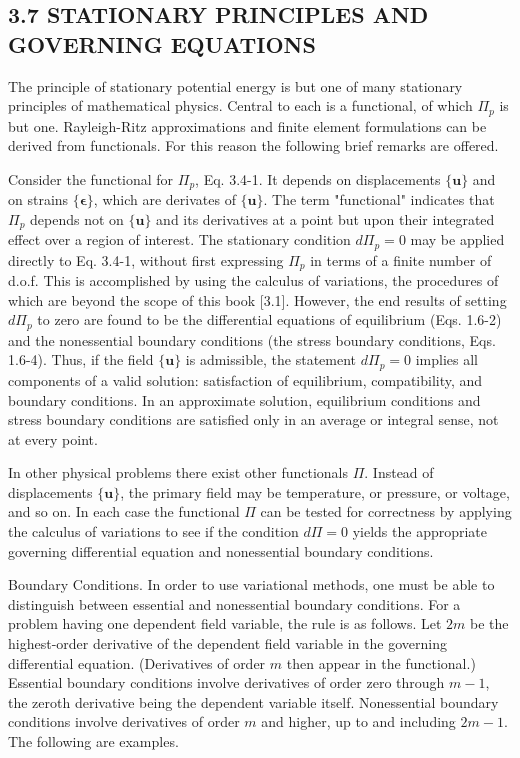 \documentclass[10pt]{article}
\begin{document}
\subsection*{3.7 STATIONARY PRINCIPLES AND GOVERNING EQUATIONS}

The principle of stationary potential energy is but one of many stationary principles of mathematical physics. Central to each is a functional, of which $\Pi_{p}$ is but one. Rayleigh-Ritz approximations and finite element formulations can be derived from functionals. For this reason the following brief remarks are offered.

Consider the functional for $\Pi_{p}$, Eq. 3.4-1. It depends on displacements $\{\mathbf{u}\}$ and on strains $\{\boldsymbol{\epsilon}\}$, which are derivates of $\{\mathbf{u}\}$. The term "functional" indicates that $\Pi_{p}$ depends not on $\{\mathbf{u}\}$ and its derivatives at a point but upon their integrated effect over a region of interest. The stationary condition $d \Pi_{p}=0$ may be applied directly to Eq. 3.4-1, without first expressing $\Pi_{p}$ in terms of a finite number of d.o.f. This is accomplished by using the calculus of variations, the procedures of which are beyond the scope of this book [3.1]. However, the end results of setting $d \Pi_{p}$ to zero are found to be the differential equations of equilibrium (Eqs. 1.6-2) and the nonessential boundary conditions (the stress boundary conditions, Eqs. 1.6-4). Thus, if the field $\{\mathbf{u}\}$ is admissible, the statement $d \Pi_{p}=0$ implies all components of a valid solution: satisfaction of equilibrium, compatibility, and boundary conditions. In an approximate solution, equilibrium conditions and stress boundary conditions are satisfied only in an average or integral sense, not at every point.

In other physical problems there exist other functionals $\Pi$. Instead of displacements $\{\mathbf{u}\}$, the primary field may be temperature, or pressure, or voltage, and so on. In each case the functional $\Pi$ can be tested for correctness by applying the calculus of variations to see if the condition $d \Pi=0$ yields the appropriate governing differential equation and nonessential boundary conditions.

Boundary Conditions. In order to use variational methods, one must be able to distinguish between essential and nonessential boundary conditions. For a problem having one dependent field variable, the rule is as follows. Let $2 m$ be the highest-order derivative of the dependent field variable in the governing differential equation. (Derivatives of order $m$ then appear in the functional.) Essential boundary conditions involve derivatives of order zero through $m-1$, the zeroth derivative being the dependent variable itself. Nonessential boundary conditions involve derivatives of order $m$ and higher, up to and including $2 m-1$. The following are examples.
\end{document}
